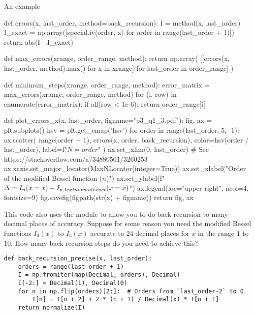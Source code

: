 \begin{algorithm}[H]
    \caption{An example}
    \label{lst:find_n}
    \begin{pythoncode}
        def errors(x, last_order, method=back_recursion):
            I = method(x, last_order)
            I_exact = np.array([special.iv(order, x) for order in range(last_order + 1)])
            return abs(I - I_exact)


        def max_errors(xrange, order_range, method):
            return np.array(
                [[errors(x, last_order, method).max() for x in xrange] for last_order in
                order_range]
            )


        def minimum_steps(xrange, order_range, method):
            error_matrix = max_errors(xrange, order_range, method)
            for (i, row) in enumerate(error_matrix):
                if all(row < 1e-6):
                    return order_range[i]


        def plot_errors_x(x, last_order, figname="p3_q1_3.pdf"):
            fig, ax = plt.subplots()
            hsv = plt.get_cmap('hsv')
            for order in range(last_order, 5, -1):
                ax.scatter(
                    range(order + 1), errors(x, order, back_recursion),
                    color=hsv(order / last_order),
                    label=f"$N={order}$"
                )
            ax.set_xlim(0, last_order)
            # See https://stackoverflow.com/a/34880501/3260253
            ax.xaxis.set_major_locator(MaxNLocator(integer=True))
            ax.set_xlabel("Order of the modified Bessel function ($n$)")
            ax.set_ylabel(f"$\Delta = I_{{n}}(x={x}) - I_{{n,\\textnormal{{exact}}}}(x={x})$")
            ax.legend(loc="upper right", ncol=4, fontsize=9)
            fig.savefig(figpath(str(x) + figname))
            return fig, ax
        \end{pythoncode}
\end{algorithm}

\Question This code also uses the  module to allow you to do back recursion to many
decimal places of accuracy. Suppose for some reason you need the modified Bessel functions
$I_0(x)$ to $I_5(x)$ accurate to $24$ decimal places for $x$ in the range $1$ to $10$. How
many back recursion steps do you need to achieve this?

\begin{verbatim}
def back_recursion_precise(x, last_order):
    orders = range(last_order + 1)
    I = np.fromiter(map(Decimal, orders), Decimal)
    I[-2:] = Decimal(1), Decimal(0)
    for n in np.flip(orders)[2:]:  # Orders from `last_order-2` to 0
        I[n] = I[n + 2] + 2 * (n + 1) / Decimal(x) * I[n + 1]
    return normalize(I)
\end{verbatim}
